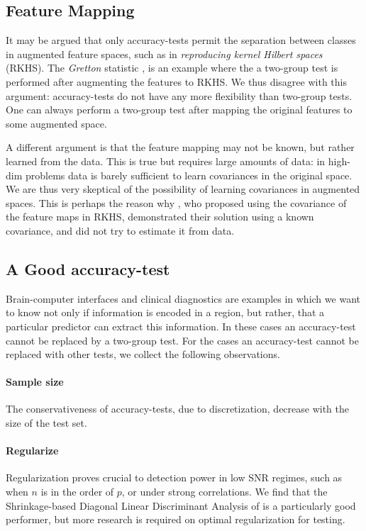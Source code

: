 \documentclass[]{bio}
\begin{document}
\subsection{Feature Mapping}
It may be argued that only accuracy-tests permit the separation between classes in augmented feature spaces, such as in \emph{reproducing kernel Hilbert spaces} (RKHS). 
The \emph{Gretton} statistic \cite{gretton_kernel_2012-1}, is an example where the a two-group test is performed after augmenting the features to RKHS.
We thus disagree with this argument: accuracy-tests do not have any more flexibility than two-group tests. 
One can always perform a two-group test after mapping the original features to some augmented space. 


A different argument is that the feature mapping may not be known, but rather learned from the data. 
This is true but requires large amounts of data: in high-dim problems data is barely sufficient to learn covariances in the original space. 
We are thus very skeptical of the possibility of learning covariances in augmented spaces. 
This is perhaps the reason why \cite{harchaoui2009kernel}, who proposed using the covariance of the feature maps in RKHS, demonstrated their solution using a known covariance, and did not try to estimate it from data. 


\subsection{A Good accuracy-test}
Brain-computer interfaces and clinical diagnostics \citep{olivetti_induction_2012,wager_fmri-based_2013} are examples in which we want to know not only if information is encoded in a region, but rather, that a particular predictor can extract this information. 
In these cases an accuracy-test cannot be replaced by a two-group test. 
For the cases an accuracy-test cannot be replaced with other tests, we collect the following observations.

\paragraph{Sample size} The conservativeness of accuracy-tests, due to discretization, decrease with the size of the test set. 

\paragraph{Regularize}
Regularization proves crucial to detection power in low SNR regimes, such as when $n$ is in the order of $p$, or under strong correlations.
We find that the Shrinkage-based Diagonal Linear Discriminant Analysis of \cite{pang_shrinkage-based_2009} is a particularly good performer, but more research is required on optimal regularization for testing. 
\end{document}
